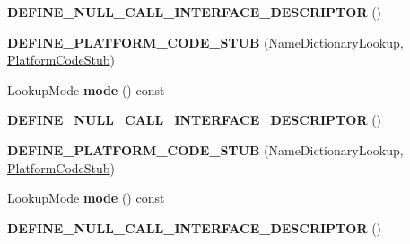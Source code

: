 \begin{DoxyCompactItemize}
\item 
{\bfseries D\+E\+F\+I\+N\+E\+\_\+\+N\+U\+L\+L\+\_\+\+C\+A\+L\+L\+\_\+\+I\+N\+T\+E\+R\+F\+A\+C\+E\+\_\+\+D\+E\+S\+C\+R\+I\+P\+T\+OR} ()\hypertarget{classv8_1_1internal_1_1_name_dictionary_lookup_stub_a56e72757ba3ab8928220e89075ca6848}{}\label{classv8_1_1internal_1_1_name_dictionary_lookup_stub_a56e72757ba3ab8928220e89075ca6848}

\item 
{\bfseries D\+E\+F\+I\+N\+E\+\_\+\+P\+L\+A\+T\+F\+O\+R\+M\+\_\+\+C\+O\+D\+E\+\_\+\+S\+T\+UB} (Name\+Dictionary\+Lookup, \hyperlink{classv8_1_1internal_1_1_platform_code_stub}{Platform\+Code\+Stub})\hypertarget{classv8_1_1internal_1_1_name_dictionary_lookup_stub_a9b6511fda10d2ab14ce9366da895bb71}{}\label{classv8_1_1internal_1_1_name_dictionary_lookup_stub_a9b6511fda10d2ab14ce9366da895bb71}

\item 
Lookup\+Mode {\bfseries mode} () const \hypertarget{classv8_1_1internal_1_1_name_dictionary_lookup_stub_ae1880a8b261f163f4d11a3d3809252ab}{}\label{classv8_1_1internal_1_1_name_dictionary_lookup_stub_ae1880a8b261f163f4d11a3d3809252ab}

\item 
{\bfseries D\+E\+F\+I\+N\+E\+\_\+\+N\+U\+L\+L\+\_\+\+C\+A\+L\+L\+\_\+\+I\+N\+T\+E\+R\+F\+A\+C\+E\+\_\+\+D\+E\+S\+C\+R\+I\+P\+T\+OR} ()\hypertarget{classv8_1_1internal_1_1_name_dictionary_lookup_stub_a56e72757ba3ab8928220e89075ca6848}{}\label{classv8_1_1internal_1_1_name_dictionary_lookup_stub_a56e72757ba3ab8928220e89075ca6848}

\item 
{\bfseries D\+E\+F\+I\+N\+E\+\_\+\+P\+L\+A\+T\+F\+O\+R\+M\+\_\+\+C\+O\+D\+E\+\_\+\+S\+T\+UB} (Name\+Dictionary\+Lookup, \hyperlink{classv8_1_1internal_1_1_platform_code_stub}{Platform\+Code\+Stub})\hypertarget{classv8_1_1internal_1_1_name_dictionary_lookup_stub_a9b6511fda10d2ab14ce9366da895bb71}{}\label{classv8_1_1internal_1_1_name_dictionary_lookup_stub_a9b6511fda10d2ab14ce9366da895bb71}

\item 
Lookup\+Mode {\bfseries mode} () const \hypertarget{classv8_1_1internal_1_1_name_dictionary_lookup_stub_ae1880a8b261f163f4d11a3d3809252ab}{}\label{classv8_1_1internal_1_1_name_dictionary_lookup_stub_ae1880a8b261f163f4d11a3d3809252ab}

\item 
{\bfseries D\+E\+F\+I\+N\+E\+\_\+\+N\+U\+L\+L\+\_\+\+C\+A\+L\+L\+\_\+\+I\+N\+T\+E\+R\+F\+A\+C\+E\+\_\+\+D\+E\+S\+C\+R\+I\+P\+T\+OR} ()\hypertarget{classv8_1_1internal_1_1_name_dictionary_lookup_stub_a56e72757ba3ab8928220e89075ca6848}{}\label{classv8_1_1internal_1_1_name_dictionary_lookup_stub_a56e72757ba3ab8928220e89075ca6848}


\end{DoxyCompactItemize}
